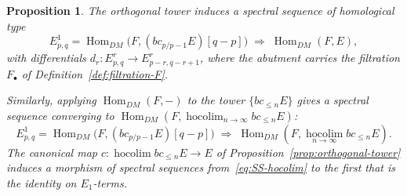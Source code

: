 \documentclass[12pt,a4paper]{article}
\newtheorem{proposition}[theorem]{Proposition}
\theoremstyle{definition}
\newcommand{\hocolim}{\operatorname*{hocolim}}
\newcommand{\Hom}{\operatorname{Hom}}
\begin{document}
\begin{proposition}\label{prop:SS-exists}
The orthogonal tower induces a spectral sequence of homological type
\[
  E^1_{p,q} = \Hom_{DM}\!\bigl(F,(bc_{p/p-1}E)[q-p]\bigr)
  \;\Rightarrow\; \Hom_{DM}(F,E),
\]
with differentials $d_r:E^r_{p,q}\to E^r_{p-r,q-r+1}$, where the abutment carries
the filtration $F_\bullet$ of Definition~\ref{def:filtration-F}.

Similarly, applying $\Hom_{DM}(F,-)$ to the tower $\{bc_{\leq n}E\}$ gives a
spectral sequence converging to $\Hom_{DM}(F,\hocolim_{n\to\infty}bc_{\leq n}E)$:
\begin{equation}\label{eq:SS-hocolim}
  E^1_{p,q} = \Hom_{DM}\!\bigl(F,(bc_{p/p-1}E)[q-p]\bigr)
  \;\Rightarrow\; \Hom_{DM}(F,\hocolim_{n\to\infty}bc_{\leq n}E).
\end{equation}
The canonical map $c:\hocolim bc_{\leq n}E\to E$ of
Proposition~\ref{prop:orthogonal-tower} induces a morphism of spectral sequences
from~\eqref{eq:SS-hocolim} to the first that is the identity on $E_1$-terms.
\end{proposition}
\end{document}
